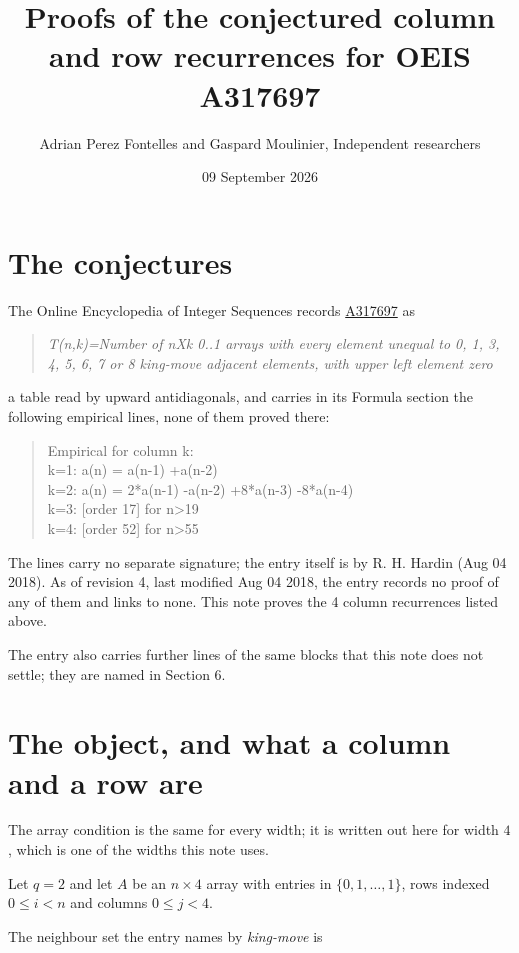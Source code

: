 \documentclass[11pt]{article}
\title{Proofs of the conjectured column and row recurrences for OEIS A317697}
\author{Adrian Perez Fontelles and Gaspard Moulinier, Independent researchers}
\date{09 September 2026}
\theoremstyle{definition}
\begin{document}
\maketitle
\section{The conjectures}

The Online Encyclopedia of Integer Sequences records \href{https://oeis.org/A317697}{A317697} as

\begin{quote}\itshape T(n,k)=Number of nXk 0..1 arrays with every element unequal to 0, 1, 3, 4, 5, 6, 7 or 8 king-move adjacent elements, with upper left element zero\end{quote}

a table read by upward antidiagonals, and carries in its Formula section the following empirical lines, none of them proved there:

\begin{quote}\ttfamily Empirical for column k:\\
k=1: a(n) = a(n-1) +a(n-2)\\k=2: a(n) = 2*a(n-1) -a(n-2) +8*a(n-3) -8*a(n-4)\\k=3: [order 17] for n>19\\k=4: [order 52] for n>55\end{quote}

The lines carry no separate signature; the entry itself is by R. H. Hardin (Aug 04 2018). As of revision 4, last modified Aug 04 2018, the entry records no proof of any of them and links to none. This note proves the 4 column recurrences listed above.

The entry also carries further lines of the same blocks that this note does not settle; they are named in Section 6.

\section{The object, and what a column and a row are}

The array condition is the same for every width; it is written out here for width $4$, which is one of the widths this note uses.

Let $q = 2$ and let $A$ be an $n \times 4$ array with entries in $\{0,1,\dots,1\}$, rows indexed $0 \le i < n$ and columns $0 \le j < 4$.

The neighbour set the entry names by {\itshape king-move} is
\end{document}
